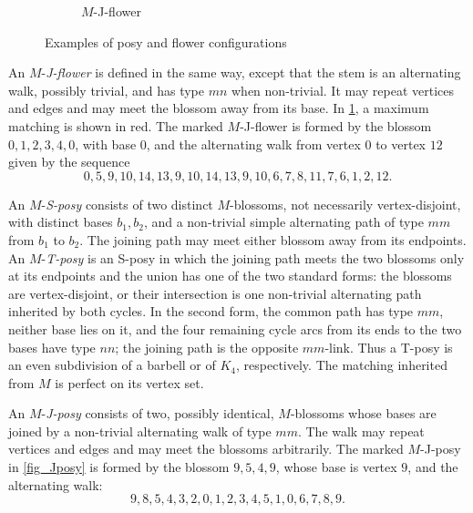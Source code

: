 \documentclass[preprint,12pt]{elsarticle}
\theoremstyle{plain}
\begin{document}
\begin{figure}[H]
\begin{subfigure}{0.5\textwidth}
		\caption{$M$-J-flower}\label{fig_Jflower}
	\end{subfigure}
	\caption{Examples of posy and flower configurations}
	\label{fig_allposies}
\end{figure}

An \(M\)-\emph{J-flower} is defined in the same way, except that the stem is an alternating walk, possibly trivial, and has type \(mn\) when non-trivial.  It may repeat vertices and edges and may meet the blossom away from its base. In \cref{fig_Jflower}, a maximum matching is shown in red. The marked $M$-J-flower is formed by the blossom \( 0,1,2,3,4,0 \), with base \( 0 \), and the alternating walk from vertex \( 0 \) to vertex \( 12 \) given by the sequence
\[
0,5,9,10,14,13,9,10,14,13,9,10,6,7,8,11,7,6,1,2,12.
\] 

An \(M\)-\emph{S-posy} consists of two distinct \(M\)-blossoms, not necessarily vertex-disjoint, with distinct bases \(b_1,b_2\), and a non-trivial simple alternating path of type \(mm\) from \(b_1\) to \(b_2\). The joining path may meet either blossom away from its endpoints. An \(M\)-\emph{T-posy} is an S-posy in which the joining path meets the two blossoms only at its endpoints and the union has one of the two standard forms: the blossoms are vertex-disjoint, or their intersection is one non-trivial alternating path inherited by both cycles.  In the second form, the common path has type \(mm\), neither base lies on it, and the four remaining cycle arcs from its ends to the two bases have type \(nn\); the joining path is the opposite \(mm\)-link.  Thus a T-posy is an even subdivision of a barbell or of \(K_4\), respectively.  The matching inherited from \(M\) is perfect on its vertex set.

An \(M\)-\emph{J-posy} consists of two, possibly identical, \(M\)-blossoms whose bases are joined by a non-trivial alternating walk of type \(mm\). The walk may repeat vertices and edges and may meet the blossoms arbitrarily.  The marked $M$-J-posy in \cref{fig_Jposy} is formed by the blossom \( 9,5,4,9 \), whose base is vertex \( 9 \), and the alternating walk:
\[
9,8,5,4,3,2,0,1,2,3,4,5,1,0,6,7,8,9.
\]
\end{document}
